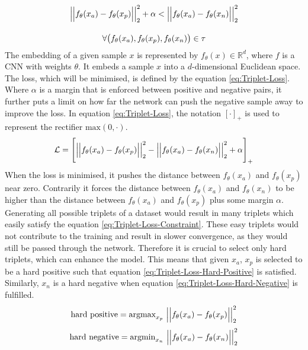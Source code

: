 \begin{equation}
    \centering
    \begin{gathered}
        \Big|\Big|f_\theta(x_a) - f_\theta(x_p)\Big|\Big|_2^2 + \alpha < \Big|\Big|f_\theta(x_a) - f_\theta(x_n)\Big|\Big|_2^2 \\[10pt]
        \forall \big(f_\theta(x_a), f_\theta(x_p), f_\theta(x_n)\big) \in \tau
    \end{gathered}
    \label{eq:Triplet-Loss-Constraint}
\end{equation}
The embedding of a given sample $x$ is represented by $f_\theta(x) \in \mathbb{R}^d$, where $f$ is a \gls{CNN} with weights $\theta$. It embeds a sample $x$ into a $d$-dimensional Euclidean space. The loss, which will be minimised, is defined by the equation \ref{eq:Triplet-Loss}. Where $\alpha$ is a margin that is enforced between positive and negative pairs, it further puts a limit on how far the network can push the negative sample away to improve the loss. In equation \ref{eq:Triplet-Loss}, the notation $[\cdot]_+$ is used to represent the rectifier $\text{max}(0, \cdot)$.
\begin{equation}
    \centering
    \mathcal{L} = \Bigg [\Big|\Big|f_\theta(x_a) - f_\theta(x_p)\Big|\Big|_2^2 - \Big|\Big|f_\theta(x_a) - f_\theta(x_n)\Big|\Big|_2^2 + \alpha \Bigg]_+
    \label{eq:Triplet-Loss}
\end{equation}
When the loss is minimised, it pushes the distance between $f_\theta(x_a)$ and $f_\theta(x_p)$ near zero. Contrarily it forces the distance between $f_\theta(x_a)$ and $f_\theta(x_n)$ to be higher than the distance between $f_\theta(x_a)$ and $f_\theta(x_p)$ plus some margin $\alpha$.
\newline
\newline
Generating all possible triplets of a dataset would result in many triplets which easily satisfy the equation \ref{eq:Triplet-Loss-Constraint}. These easy triplets would not contribute to the training and result in slower convergence, as they would still be passed through the network. Therefore it is crucial to select only hard triplets, which can enhance the model. This means that given $x_a$, $x_p$ is selected to be a hard positive such that equation \ref{eq:Triplet-Loss-Hard-Positive} is satisfied. Similarly, $x_n$ is a hard negative when equation \ref{eq:Triplet-Loss-Hard-Negative} is fulfilled.
\begin{equation}
    \centering
    \text{hard positive} = \text{argmax}_{x_p} \ \Big|\Big|f_\theta(x_a) - f_\theta(x_p)\Big|\Big|_2^2
    \label{eq:Triplet-Loss-Hard-Positive}
\end{equation}
\begin{equation}
    \centering
    \text{hard negative} = \text{argmin}_{x_n} \ \Big|\Big|f_\theta(x_a) - f_\theta(x_n)\Big|\Big|_2^2
    \label{eq:Triplet-Loss-Hard-Negative}
\end{equation}

